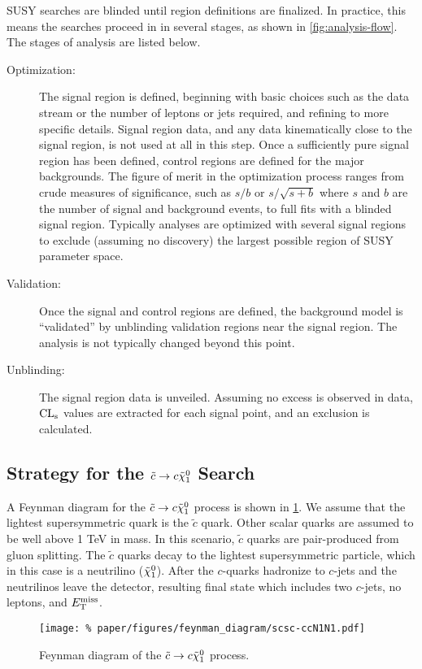 SUSY searches are blinded until region definitions are finalized. In practice, this means the searches proceed in in several stages, as shown in \cref{fig:analysis-flow}. The stages of analysis are listed below.
\begin{description}
\item[Optimization:] The signal region is defined, beginning with basic choices such as the data stream or the number of leptons or jets required, and refining to more specific details. Signal region data, and any data kinematically close to the signal region, is not used at all in this step. Once a sufficiently pure signal region has been defined, control regions are defined for the major backgrounds. The figure of merit in the optimization process ranges from crude measures of significance, such as $s/b$ or $s/\sqrt{s + b}$ where $s$ and $b$ are the number of signal and background events, to full fits with a blinded signal region. Typically analyses are optimized with several signal regions to exclude (assuming no discovery) the largest possible region of SUSY parameter space.
\item[Validation:] Once the signal and control regions are defined, the background model is ``validated'' by unblinding validation regions near the signal region. The analysis is not typically changed beyond this point.
\item[Unblinding:] The signal region data is unveiled. Assuming no excess is observed in data, $\mathrm{CL}_{\mathrm{s}}$ values are extracted for each signal point, and an exclusion is calculated.
\end{description}


\subsection{Strategy for the $\tilde{c} \to c \tilde{\chi}_1^0$ Search}

A Feynman diagram for the $\tilde{c} \to c \tilde{\chi}_1^0$ process is shown in \cref{fig:sctocfeyn}. We assume that the lightest supersymmetric quark is the $\tilde{c}$ quark. Other scalar quarks are assumed to be well above 1 TeV in mass. In this scenario, $\tilde{c}$ quarks are pair-produced from gluon splitting. The $\tilde{c}$ quarks decay to the lightest supersymmetric particle, which in this case is a neutrilino ($\tilde{\chi}_1^0$). After the $c$-quarks hadronize to $c$-jets and the neutrilinos leave the detector, resulting final state which includes two $c$-jets, no leptons, and $E_{\rm T}^{\rm miss}$.

\begin{figure}
  \begin{center}
    \texttt{[image: \%
      paper/figures/feynman\_diagram/scsc-ccN1N1.pdf]}
    \caption{Feynman diagram of the $\tilde{c} \to c \tilde{\chi}_1^0$ process.}
    \label{fig:sctocfeyn}
  \end{center}
\end{figure}

